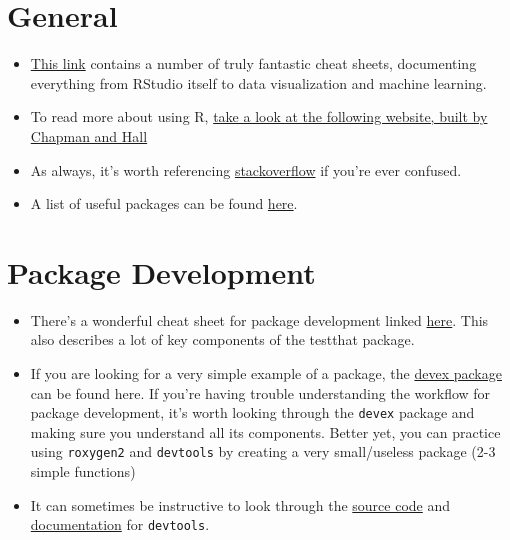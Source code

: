 \documentclass[
]{book}
\begin{document}
\hypertarget{general}{%
\section{General}\label{general}}

\begin{itemize}
\item
  \href{https://www.rstudio.com/resources/cheatsheets/}{This link} contains a number of truly fantastic cheat sheets, documenting everything from RStudio itself to data visualization and machine learning.
\item
  To read more about using R, \href{http://adv-r.had.co.nz/}{take a look at the following website, built by Chapman and Hall}
\item
  As always, it's worth referencing \href{https://stackoverflow.com/questions/tagged/r/}{stackoverflow} if you're ever confused.
\item
  A list of useful packages can be found \href{https://support.rstudio.com/hc/en-us/articles/201057987-Quick-list-of-useful-R-packages}{here}.
\end{itemize}

\hypertarget{package-development-1}{%
\section{Package Development}\label{package-development-1}}

\begin{itemize}
\item
  There's a wonderful cheat sheet for package development linked \href{https://www.rstudio.com/wp-content/uploads/2015/06/devtools-cheatsheet.pdf}{here}. This also describes a lot of key components of the testthat package.
\item
  If you are looking for a very simple example of a package, the \href{https://github.com/IQSS/Rbuild/tree/master/devex}{devex package} can be found here. If you're having trouble understanding the workflow for package development, it's worth looking through the \texttt{devex} package and making sure you understand all its components. Better yet, you can practice using \texttt{roxygen2} and \texttt{devtools} by creating a very small/useless package (2-3 simple functions)
\item
  It can sometimes be instructive to look through the \href{https://www.rdocumentation.org/packages/devtools/versions/1.13.3/source}{source code} and \href{https://www.rdocumentation.org/packages/devtools/versions/1.13.3}{documentation} for \texttt{devtools}.
\end{itemize}
\end{document}

